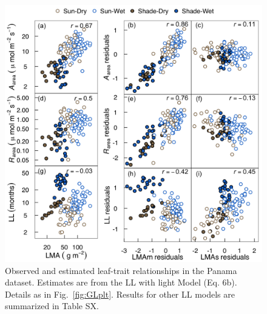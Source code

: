 \documentclass[
  12pt,
  a4paper,
,tablecaptionabove
]{scrartcl}
\begin{document}
\begin{figure}
\hypertarget{fig:PAplt}{%
\centering
\includegraphics{../figs/PA_3.png}
\caption{Observed and estimated leaf-trait relationships in the Panama dataset.
Estimates are from the LL with light Model (Eq. 6b).
Details as in Fig.~\ref{fig:GLplt}.
Results for other LL models are summarized in Table SX.}\label{fig:PAplt}
}
\end{figure}

\newpage
\end{document}
